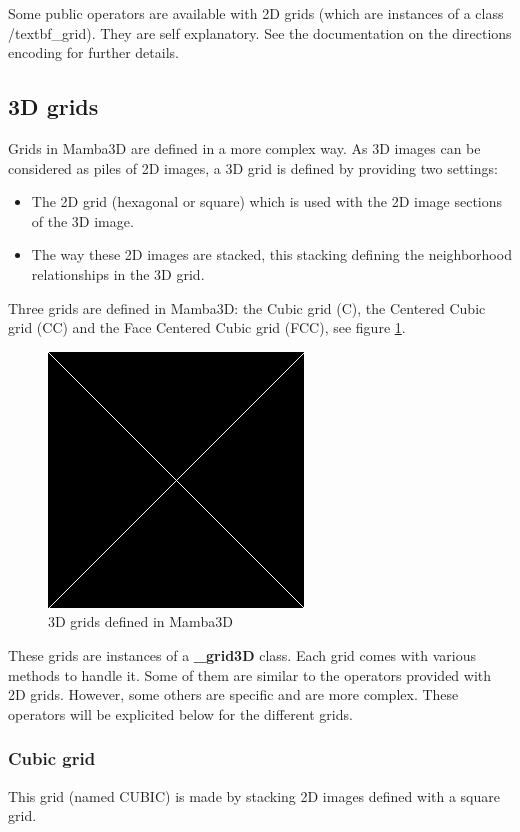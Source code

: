 \documentclass[a4paper,10pt,oneside]{article}
\begin{document}
Some public operators are available with 2D grids (which are instances of a class /textbf{\_grid}). They are self
explanatory. See the documentation on the directions encoding for further details.

\subsection{3D grids}
Grids in Mamba3D are defined in a more complex way. As 3D images can be considered as piles of 2D images,
a 3D grid is defined by providing two settings:

\begin{itemize}
\item The 2D grid (hexagonal or square) which is used with the 2D image sections of the 3D image.
\item The way these 2D images are stacked, this stacking defining the neighborhood relationships in the 3D grid.
\end{itemize}

Three grids are defined in Mamba3D: the Cubic grid (C), the Centered Cubic grid (CC) and the Face Centered Cubic grid (FCC),
see figure \ref{fig:3D_grids}.

\begin{figure}
\centering
\includegraphics[scale=0.3]{figures/xxx.png}
\caption{3D grids defined in Mamba3D}
\label{fig:3D_grids}
\end{figure}

These grids are instances of a \textbf{\_grid3D} class. Each grid comes with various methods to handle it. Some of them are similar to
the operators provided with 2D grids. However, some others are specific and are more complex. These operators will be explicited
below for the different grids.

\subsubsection{Cubic grid}
This grid (named CUBIC) is made by stacking 2D images defined with a square grid.
\end{document}
